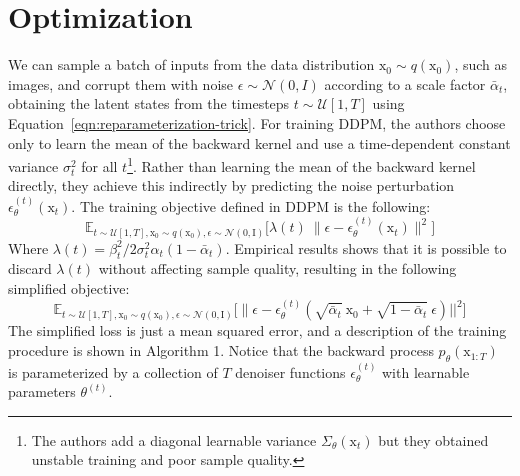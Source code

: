 \section{Optimization}\label{sec:optimization-ddpm}

We can sample a batch of inputs from the data distribution $\mathrm{x}_{0}\sim q(\mathrm{x}_{0})$, such as images, and corrupt them with noise $\epsilon\sim\mathcal{N}(0, I)$ according to a scale factor $\bar{\alpha}_{t}$, obtaining the latent states from the timesteps $t\sim\mathcal{U}[1, T]$ using Equation~\ref{eqn:reparameterization-trick}. For training DDPM, the authors choose only to learn the mean of the backward kernel and use a time-dependent constant variance $\sigma_{t}^{2}$ for all $t$\footnote{The authors add a diagonal learnable variance $\Sigma_{\theta}(\mathrm{x}_{t})$ but they obtained unstable training and poor sample quality.}. Rather than learning the mean of the backward kernel directly, they achieve this indirectly by predicting the noise perturbation $\epsilon_{\theta}^{(t)}(\mathrm{x}_{t})$. The training objective defined in DDPM is the following:
\begin{equation}\label{eqn:ho-eq12}
    \mathbb{E}_{t\sim\mathcal{U}[1, T], \mathrm{x}_{0}\sim q(\mathrm{x}_{0}), \epsilon\sim\mathcal{N}(0, \mathrm{I})}  \big[\lambda(t) ~ \|\epsilon - \epsilon_{\theta}^{(t)}(\mathrm{x}_{t}) \|^{2} \big]
\end{equation}
Where $\lambda(t)= \beta_{t}^{2} / 2\sigma_{t}^{2}\alpha_{t}(1-\bar{\alpha}_{t})$. Empirical results shows that it is possible to discard $\lambda(t)$ without affecting sample quality, resulting in the following simplified objective:
\begin{equation}\label{eqn:ho-eq14}
    \mathbb{E}_{t\sim\mathcal{U}[1, T], \mathrm{x}_{0}\sim q(\mathrm{x}_{0}), \epsilon\sim\mathcal{N}(0, \mathrm{I})} \big[\| \epsilon - \epsilon_{\theta}^{(t)}(\sqrt{\bar{\alpha}_{t}}~\mathrm{x}_{0} + \sqrt{1-\bar{\alpha}_{t}}~\epsilon) ||^{2} \big]
\end{equation}
The simplified loss is just a mean squared error, and a description of the
training procedure is shown in Algorithm 1. Notice that the backward process $p_{\theta}(\mathrm{x}_{1:T})$ is parameterized by a collection of $T$ denoiser functions $\epsilon_{\theta}^{(t)}$ with learnable parameters $\theta^{(t)}$.
